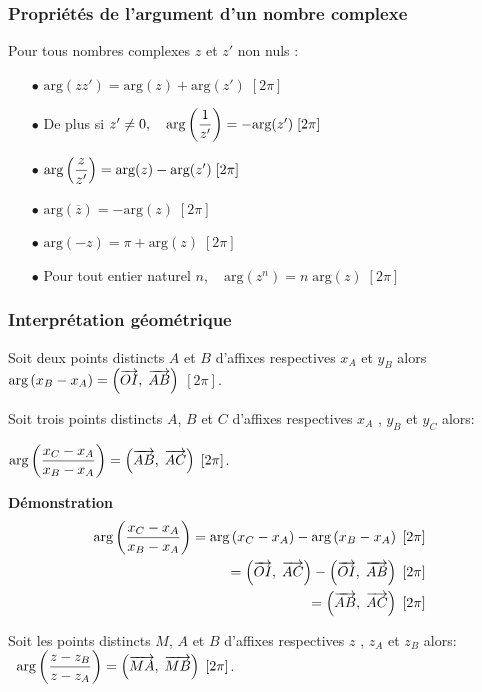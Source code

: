 \subsubsection*{Propriétés de l'argument d'un nombre complexe}
\begin{property}
Pour tous nombres complexes $z $ et $z' $ non nuls :

\medskip

\begin{itemize}
\item[$  \bullet$]  $ \text{arg}(zz') =\text{arg}(z) +\text{arg}(z') \; [2\pi]$
 \item[$  \bullet$]   De plus si $ z'\neq 0,  \quad   \text{arg}\left(\dfrac{1}{z'}\right)=-\text{arg}(z')\; [2\pi]$ \item[$  \bullet$] $  \text{arg}\left(\dfrac{z}{z'}\right)=\text{arg}(z)- \text{arg}(z') \; [2\pi]$ 


\medskip

\item[$  \bullet$]   $ \text{arg}(\overline{z})=-\text{arg}(z) \; [2\pi]$
\item[$  \bullet$]  $ \text{arg}(-z)=\pi +\text{arg}(z) \; [2\pi]$

\medskip
 \item[$  \bullet$] Pour tout entier naturel $ n, \quad  \text{arg}(z^n) =n \; \text{arg}(z) \; [2\pi]$
\end{itemize}


\end{property}
\subsubsection*{Interprétation géométrique }
Soit deux points distincts  $A $ et $ B$ d'affixes respectives $ x_A$ et $y_B $ alors $ \text{arg}\left(x_B - x_A\right) =\left( \overrightarrow{OI},\;\overrightarrow{AB} \right)$\; $ [2\pi]$.

Soit trois points distincts  $A $, $ B$ et $ C$ d'affixes respectives $ x_A$ , $y_B $  et $y_C $ alors:

\medskip
 $ \text{arg}\left(\dfrac{x_C - x_A}{x_B - x_A}\right) =\left( \overrightarrow{AB},\;\overrightarrow{AC} \right) \; [2\pi]$.
 
 \bigskip
 
 \textbf{Démonstration}
 \begin{align*}
  \text{arg}\left(\dfrac{x_C - x_A}{x_B - x_A}\right)= \text{arg}\left(x_C - x_A\right)- \text{arg}\left(x_B - x_A\right)\; [2\pi]& \\=\left( \overrightarrow{OI},\;\overrightarrow{AC} \right)-\left( \overrightarrow{OI},\;\overrightarrow{AB} \right)\; [2\pi]&\\=\left( \overrightarrow{AB},\;\overrightarrow{AC} \right)  \; [2\pi]
  \end{align*}
  \begin{corollary}
  Soit les points distincts $M $, $ A $  et $ B$ d'affixes respectives $ z$ , $z_A $  et $z_B $ alors:
  $\;\; \text{arg}\left(\dfrac{z - z_B}{z - z_A}\right) =\left( \overrightarrow{MA},\;\overrightarrow{MB} \right) \; [2\pi]$.
  
 \end{corollary}
